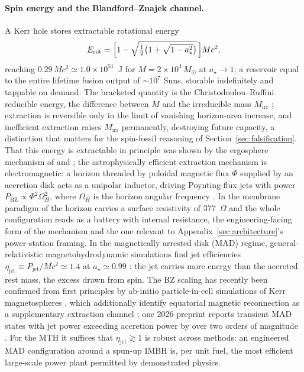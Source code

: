 \documentclass[11pt]{article}
\newcommand{\msun}{\ensuremath{M_\odot}}
\newcommand{\astar}{\ensuremath{a_\star}}
\begin{document}
\paragraph{Spin energy and the Blandford--Znajek channel.} A Kerr hole stores extractable rotational energy
\begin{equation}
E_{\mathrm{rot}} = \Bigl[1 - \sqrt{\tfrac{1}{2}\bigl(1 + \sqrt{1-\astar^{2}}\bigr)}\,\Bigr] M c^{2},
\end{equation}
reaching $0.29\,Mc^{2} \simeq 1.0\times10^{51}$~J for $M = 2\times10^{4}\,\msun$ at $\astar \to 1$: a reservoir equal to the entire lifetime fusion output of $\sim$$10^{7}$ Suns, storable indefinitely and tappable on demand. The bracketed quantity is the Christodoulou--Ruffini reducible energy, the difference between $M$ and the irreducible mass $M_{\mathrm{irr}}$ \citep{Christodoulou1970,ChristodoulouRuffini1971}; extraction is reversible only in the limit of vanishing horizon-area increase, and inefficient extraction raises $M_{\mathrm{irr}}$ permanently, destroying future capacity, a distinction that matters for the spin-fossil reasoning of Section~\ref{sec:falsification}. That this energy is extractable in principle was shown by the ergosphere mechanism of \citet{Penrose1969} and \citet{PenroseFloyd1971}; the astrophysically efficient extraction mechanism is electromagnetic: a horizon threaded by poloidal magnetic flux $\Phi$ supplied by an accretion disk acts as a unipolar inductor, driving Poynting-flux jets with power $P_{\mathrm{BZ}} \propto \Phi^{2}\Omega_{H}^{2}$, where $\Omega_{H}$ is the horizon angular frequency \citep{BlandfordZnajek1977}. In the membrane paradigm of \citet{ThornePriceMacdonald1986} the horizon carries a surface resistivity of 377~$\Omega$ and the whole configuration reads as a battery with internal resistance, the engineering-facing form of the mechanism and the one relevant to Appendix~\ref{sec:architecture}'s power-station framing. In the magnetically arrested disk (MAD) regime, general-relativistic magnetohydrodynamic simulations find jet efficiencies $\eta_{\mathrm{jet}} \equiv P_{\mathrm{jet}}/\dot M c^{2} \simeq 1.4$ at $\astar \simeq 0.99$ \citep{Tchekhovskoy2011,Tchekhovskoy2015}: the jet carries more energy than the accreted rest mass, the excess drawn from spin. The BZ scaling has recently been confirmed from first principles by ab-initio particle-in-cell simulations of Kerr magnetospheres \citep{Meringolo2025}, which additionally identify equatorial magnetic reconnection as a supplementary extraction channel \citep{ComissoAsenjo2021,CamilloniRezzolla2025}; one 2026 preprint reports transient MAD states with jet power exceeding accretion power by over two orders of magnitude \citep[not yet peer-reviewed]{Nathanail2026}. For the MTH it suffices that $\eta_{\mathrm{jet}} \gtrsim 1$ is robust across methods: an engineered MAD configuration around a spun-up IMBH is, per unit fuel, the most efficient large-scale power plant permitted by demonstrated physics.
\end{document}
